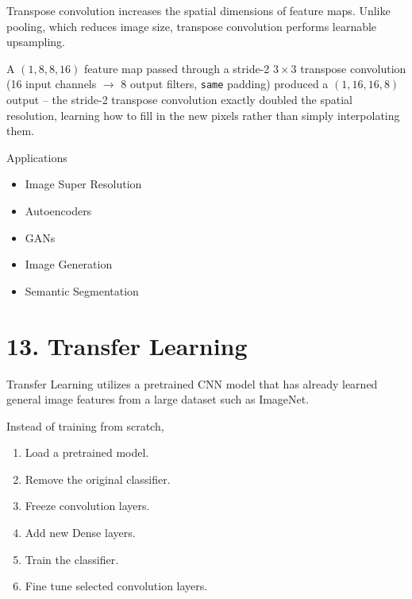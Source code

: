 \documentclass[11pt]{article}
\begin{document}
Transpose convolution increases the spatial dimensions of feature maps.
Unlike pooling, which reduces image size, transpose convolution performs
learnable upsampling.

A $(1,8,8,16)$ feature map passed through a stride-2 $3\times3$
transpose convolution (16 input channels $\rightarrow$ 8 output
filters, \texttt{same} padding) produced a $(1,16,16,8)$ output --
the stride-2 transpose convolution exactly doubled the spatial
resolution, learning how to fill in the new pixels rather than
simply interpolating them.

Applications

\begin{itemize}
\item Image Super Resolution
\item Autoencoders
\item GANs
\item Image Generation
\item Semantic Segmentation
\end{itemize}


\section*{13. Transfer Learning}

Transfer Learning utilizes a pretrained CNN model that has already learned
general image features from a large dataset such as ImageNet.

Instead of training from scratch,

\begin{enumerate}
\item Load a pretrained model.
\item Remove the original classifier.
\item Freeze convolution layers.
\item Add new Dense layers.
\item Train the classifier.
\item Fine tune selected convolution layers.
\end{enumerate}
\end{document}
